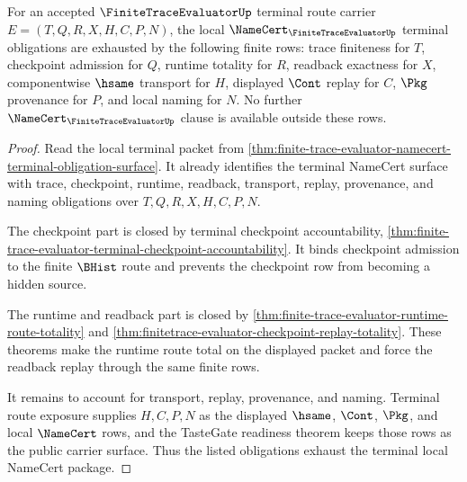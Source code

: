 \begin{theorem}
\label{thm:finite-trace-evaluator-terminal-namecert-exhaustion}
For an accepted $\FiniteTraceEvaluatorUp$ terminal route carrier
$E=(T,Q,R,X,H,C,P,N)$, the local
$\NameCert_{\FiniteTraceEvaluatorUp}$ terminal obligations are exhausted by
the following finite rows: trace finiteness for $T$, checkpoint admission for
$Q$, runtime totality for $R$, readback exactness for $X$, componentwise
$\hsame$ transport for $H$, displayed $\Cont$ replay for $C$, $\Pkg$
provenance for $P$, and local naming for $N$. No further
$\NameCert_{\FiniteTraceEvaluatorUp}$ clause is available outside these
rows.
\end{theorem}
\begin{proof}
Read the local terminal packet from
\autoref{thm:finite-trace-evaluator-namecert-terminal-obligation-surface}. It
already identifies the terminal NameCert surface with trace, checkpoint,
runtime, readback, transport, replay, provenance, and naming obligations over
$T,Q,R,X,H,C,P,N$.

The checkpoint part is closed by terminal checkpoint accountability,
\autoref{thm:finite-trace-evaluator-terminal-checkpoint-accountability}. It
binds checkpoint admission to the finite $\BHist$ route and prevents the
checkpoint row from becoming a hidden source.

The runtime and readback part is closed by
\autoref{thm:finite-trace-evaluator-runtime-route-totality} and
\autoref{thm:finitetrace-evaluator-checkpoint-replay-totality}. These
theorems make the runtime route total on the displayed packet and force the
readback replay through the same finite rows.

It remains to account for transport, replay, provenance, and naming. Terminal
route exposure supplies $H,C,P,N$ as the displayed $\hsame$, $\Cont$, $\Pkg$,
and local $\NameCert$ rows, and the TasteGate readiness theorem keeps those
rows as the public carrier surface. Thus the listed obligations exhaust the
terminal local NameCert package.
\end{proof}

